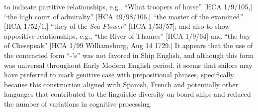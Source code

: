 \begin{styleStandard}
to indicate partitive relationships, e.g., “What troopers of horse” [HCA 1/9/105,] “the high court of admiralty” [HCA 49/98/106,] “the master of the examined” [HCA 1/52/1,] “they of the \textit{Sea Flower}” [HCA 1/53/57]; and also to show appositive relationships, e.g., “the River of Thames” [HCA 1/9/64] and “the bay of Chesepeak” [HCA 1/99 Williamsburg, Aug 14 1729.] It appears that the use of the contracted form “-’s” was not favored in Ship English, and although this form was universal throughout Early Modern English period, it seems that sailors may have preferred to mark genitive case with prepositional phrases, specifically because this construction aligned with Spanish, French and potentially other languages that contributed to the linguistic diversity on board ships and reduced the number of variations in cognitive processing.
\end{styleStandard}


